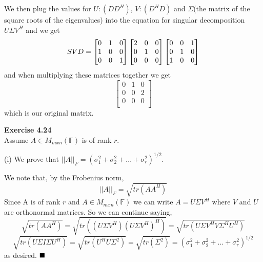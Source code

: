 \documentclass[letterpaper,12pt]{article}
\theoremstyle{definition}
\begin{document}
We then plug the values for $U :(DD^H)$, $V:(D^HD)$ and $\Sigma$(the matrix of the square roots of the eigenvalues) into the equation for singular decomposition $U \Sigma V^H$ and we get
\[S\\VD=
\begin{bmatrix}
   0 &  1 & 0 \\
   1 &  0 & 0\\
   0 & 0 & 1\\
  \end{bmatrix}
  \begin{bmatrix}
   2 &  0 & 0 \\
   0 &  1 & 0\\
   0 & 0 & 0\\
  \end{bmatrix}
  \begin{bmatrix}
   0 &  0 & 1 \\
   0 &  1& 0\\
   1 & 0 & 0\\
  \end{bmatrix}\]
and when multiplying these matrices together we get
\[\begin{bmatrix}
   0 &  1 & 0 \\
   0 &  0& 2\\
   0 & 0 & 0\\
  \end{bmatrix}\]
  which is our original matrix.


\textbf{Exercise 4.24}\\

Assume $A \in M_{mxn}(\mathbb{F})$ is of rank $r$. 

(i) We prove that $||A||_{F}=(\sigma_{1}^2+\sigma_{2}^2+...+\sigma _{r}^2)^{1/2}$.

We note that, by the Frobenius norm, 
\[||A||_{F}=\sqrt{tr(AA^H)}\]
Since A is of rank $r$ and $A \in M_{mxn}(\mathbb{F})$ we can write $A=U\Sigma V^H$ where $V$ and $U$ are orthonormal matrices. So we can continue saying,
\[\sqrt{tr(AA^H)}=\sqrt{tr((U\Sigma V^H)(U\Sigma V^H)^H)}=\sqrt{tr(U\Sigma V^HV\Sigma^H U^H)}\]
\[\sqrt{tr(U\Sigma I\Sigma U^H)}=\sqrt{tr(U^H U\Sigma^2)}=\sqrt{tr(\Sigma^2)}=(\sigma_{1}^2+\sigma_{2}^2+...+\sigma _{r}^2)^{1/2}\]
as desired.
$\hfill \blacksquare$\\
\end{document}
